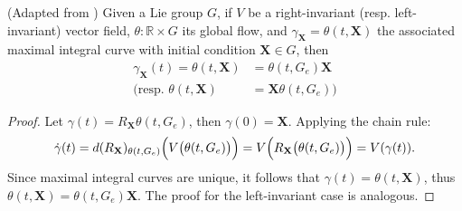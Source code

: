 \begin{lemma}\label{lemma:lie-group-flow}
    (Adapted from \citet[p. 570]{Gallier2020}) Given a Lie group $G$, if $V$ be a right-invariant (resp. left-invariant) vector field, $\theta:\mathbb{R}\times G$ its global flow, and $\gamma_\mathbf{X}=\theta(t, \mathbf{X})$ the associated maximal integral curve with initial condition $\mathbf{X}\in G$, then
    \begin{align*}
        \gamma_\mathbf{X}(t) = \theta(t, \mathbf{X}) &=  \theta(t, G_e)\mathbf{X}\\
        \bigl(\text{resp. }\theta(t, \mathbf{X}) &=  \mathbf{X}\theta(t, G_e)\bigr)
    \end{align*}
\end{lemma}
\begin{proof}
    Let $\gamma(t) = R_{\mathbf{X}}\theta(t, G_e)$, then $\gamma(0) = \mathbf{X}$. Applying the chain rule:
    \begin{align}
        \dot{\gamma}(t) = d(R_{\mathbf{X}})_{\theta(t, G_e)}\Bigl(V\bigl(\theta(t, G_e)\bigr)\Bigr) = V\Bigl(R_{\mathbf{X}}\bigl(\theta(t, G_e)\bigr)\Bigr) = V(\gamma(t)).
    \end{align}
    Since maximal integral curves are unique, it follows that $\gamma(t) = \theta(t, \mathbf{X})$, thus $\theta(t, \mathbf{X}) = \theta(t, G_e)\mathbf{X}$. The proof for the left-invariant case is analogous.
\end{proof}

